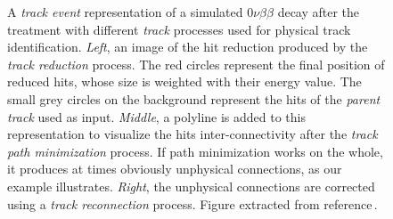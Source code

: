 \begin{figure}[htb!]
\centering
    \caption{A \emph{track event} representation of a simulated $0\nu\beta\beta$ decay after the treatment with different \emph{track} processes used for physical track identification. \emph{Left}, an image of the hit reduction produced by the \emph{track reduction} process. The red circles represent the final position of reduced hits, whose size is weighted with their energy value. The small grey circles on the background represent the hits of the \emph{parent track} used as input. \emph{Middle}, a polyline is added to this representation to visualize the hits inter-connectivity after the \emph{track path minimization} process. If path minimization works on the whole, it produces at times obviously unphysical connections, as our example illustrates. \emph{Right}, the unphysical connections are corrected using a \emph{track reconnection} process. Figure extracted from reference\,\cite{Galan:2019ake}.}
    \label{fig:tracklib}
\end{figure}

